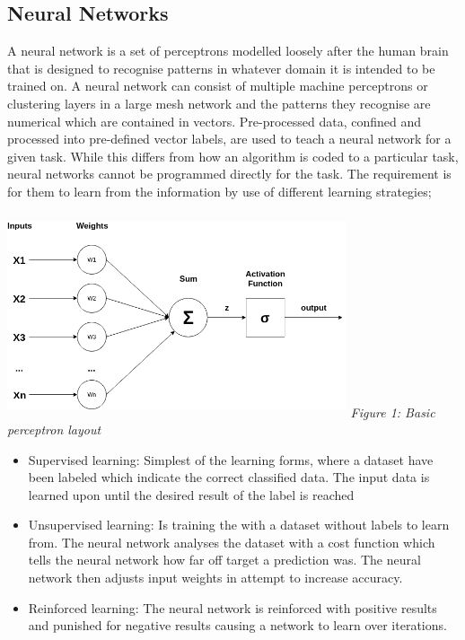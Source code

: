 \documentclass[oneside, 10pt]{article}
\begin{document}
		\subsection{Neural Networks}\label{networks}
			A neural network is a set of perceptrons modelled loosely after the human brain that is designed to recognise patterns in whatever domain it is intended to be trained on. A neural network can consist of multiple machine perceptrons or clustering layers in a large mesh network and the patterns they recognise are numerical which are contained in vectors. Pre-processed data, confined and processed into pre-defined vector labels, are used to teach a neural network for a given task. While this differs from how an algorithm is coded to a particular task, neural networks cannot be programmed directly for the task. The requirement is for them to learn from the information by use of different learning strategies; \cite{14}\cite{15}
			
			\begin{center}
				\includegraphics[width=10cm,height=6cm]{images/perceptron.png}
				\newline
				\textit{Figure 1: Basic perceptron layout}
			\end{center}
			
			\begin{itemize}
				\item Supervised learning: Simplest of the learning forms, where a dataset have been labeled which indicate the correct classified data. The input data is learned upon until the desired result of the label is reached \cite{16}
				\item Unsupervised learning: Is training the with a dataset without labels to learn from. The neural network analyses the dataset with a cost function which tells the neural network how far off target a prediction was. The neural network then adjusts input weights in attempt to increase accuracy. \cite{15}
				\item Reinforced learning: The neural network is reinforced with positive results and punished for negative results causing a network to learn over iterations. 
			\end{itemize}
		
\end{document}
